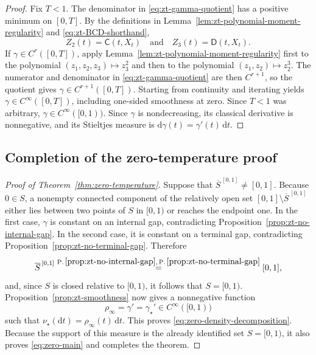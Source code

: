 \documentclass[10pt]{amsart}
\theoremstyle{definition}
\theoremstyle{remark}
\numberwithin{equation}{section}
\newcommand{\1}{\mathbf 1}
\newcommand{\dd}{\,\mathrm d}
\newcommand{\stackref}[2]{\stackrel{#2}{#1}}
\begin{document}
\begin{proof}
Fix $T<1$. The denominator in \eqref{eq:zt-gamma-quotient} has a positive minimum on $[0,T]$. By the definitions in Lemma~\ref{lem:zt-polynomial-moment-regularity} and \eqref{eq:zt-BCD-shorthand},
\begin{equation*}
 Z_2(t)=\mathsf C(t,X_t)\quad\text{and}\quad Z_3(t)=\mathsf D(t,X_t).
\end{equation*}
If $\gamma\in C^r([0,T])$, apply Lemma~\ref{lem:zt-polynomial-moment-regularity} first to the polynomial $(z_1,z_2,z_3)\mapsto z_3^2$ and then to the polynomial $(z_1,z_2)\mapsto z_2^3$. The numerator and denominator in \eqref{eq:zt-gamma-quotient} are then $C^{r+1}$, so the quotient gives $\gamma\in C^{r+1}([0,T])$. Starting from continuity and iterating yields $\gamma\in C^\infty([0,T])$, including one-sided smoothness at zero. Since $T<1$ was arbitrary, $\gamma\in C^\infty([0,1))$. Since $\gamma$ is nondecreasing, its classical derivative is nonnegative, and its Stieltjes measure is $\mathrm d\gamma(t)=\gamma'(t)\dd t$.
\end{proof}

\subsection{Completion of the zero-temperature proof}
\label{sec:zt-completion}

\begin{proof}[Proof of Theorem~\ref{thm:zero-temperature}]
Suppose that $\overline S^{\,[0,1]}\neq[0,1]$.  Because $0\in S$, a nonempty connected component of the relatively open set $[0,1]\setminus\overline S^{\,[0,1]}$ either lies between two points of $S$ in $[0,1)$ or reaches the endpoint one.  In the first case, $\gamma$ is constant on an internal gap, contradicting Proposition~\ref{prop:zt-no-internal-gap}.  In the second case, it is constant on a terminal gap, contradicting Proposition~\ref{prop:zt-no-terminal-gap}.  Therefore
\begin{equation*}
 \overline S^{\,[0,1]}
 \stackref{=}{\mathrm{P.\,\ref{prop:zt-no-internal-gap}},\,\mathrm{P.\,\ref{prop:zt-no-terminal-gap}}}
 [0,1],
\end{equation*}
and, since $S$ is closed relative to $[0,1)$, it follows that $S=[0,1)$.  Proposition~\ref{prop:zt-smoothness} now gives a nonnegative function
\begin{equation*}
 \rho_\infty=\gamma'=\gamma_\star'\in C^\infty([0,1))
\end{equation*}
such that $\nu_\star(\mathrm d t)=\rho_\infty(t)\dd t$.  This proves \eqref{eq:zero-density-decomposition}.  Because the support of this measure is the already identified set $S=[0,1)$, it also proves \eqref{eq:zero-main} and completes the theorem.
\end{proof}
\end{document}
